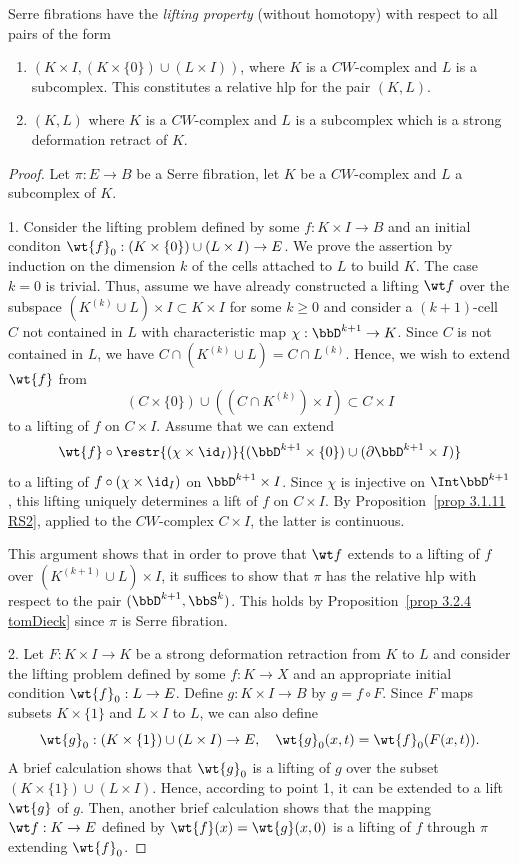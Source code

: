 \begin{prop}[{{\cite[Prop.~3.2.3]{RS2}}}]\label{prop 3.2.3 RS2}
    Serre fibrations have the \textit{lifting property} (without homotopy) with respect to all pairs of the form
    \begin{enumerate}
        \item $(K\times I,(K\times \{0\})\cup(L\times I))$, where $K$ is a $CW$-complex and $L$ is a subcomplex. This constitutes a relative \gls{hlp} for the pair $(K,L)$.
        \item $(K,L)$ where $K$ is a $CW$-complex and $L$ is a subcomplex which is a strong deformation retract of $K$.
    \end{enumerate}
\end{prop}
\begin{proof}
    Let $\pi:E\to B$ be a Serre fibration, let $K$ be a $CW$-complex and $L$ a subcomplex of $K$.

    1. Consider the lifting problem defined by some $f:K\times I\to B$ and an initial conditon $\wt{f}_0:(K\times\{0\})\cup(L\times I)\to E$. We prove the assertion by induction on the dimension $k$ of the cells attached to $L$ to build $K$. The case $k=0$ is trivial. Thus, assume we have already constructed a lifting $\wt f$ over the subspace $(K^{(k)}\cup L)\times I\subset K\times I$ for some $k\geq 0$ and consider a $(k+1)$-cell $C$ not contained in $L$ with characteristic map $\chi:\bbD^{k+1}\to K$. Since $C$ is not contained in $L$, we have $C\cap (K^{(k)}\cup L)=C\cap L^{(k)}$. Hence, we wish to extend $\wt{f}$ from 
    \[(C\times\{0\}) \cup((C\cap K^{(k)})\times I)\subset C\times I\]
    to a lifting of $f$ on $C\times I$. Assume that we can extend
    \[\wt{f}\circ \restr{(\chi\times\id_I)}{(\bbD^{k+1}\times\{0\})\cup (\partial \bbD^{k+1}\times I)}\]
    to a lifting of $f\circ (\chi\times\id_I)$ on $\bbD^{k+1}\times I$. Since $\chi $ is injective on $\Int \bbD^{k+1}$, this lifting uniquely determines a lift of $f$ on $C\times I$. By Proposition~\ref{prop 3.1.11 RS2}, applied to the $CW$-complex $C\times I$, the latter is continuous.

    This argument shows that in order to prove that $\wt f$ extends to a lifting of $f$ over $(K^{(k+1)}\cup L)\times I$, it suffices to show that $\pi$ has the relative \gls{hlp} with respect to the pair $(\bbD^{k+1},\bbS^k)$. This holds by Proposition~\ref{prop 3.2.4 tomDieck} since $\pi$ is Serre fibration.

    2. Let $F:K\times I\to K$ be a strong deformation retraction from $K$ to $L$ and consider the lifting problem defined by some $f:K\to X$ and an appropriate initial condition $\wt{f}_0:L\to E$. Define $g:K\times I\to B$ by $g=f\circ F$. Since $F$ maps subsets $K\times\{1\}$ and $L\times I$ to $L$, we can also define
    \[\wt{g}_0:(K\times\{1\})\cup(L\times I)\to E,\quad \wt{g}_0(x,t)=\wt{f}_0(F(x,t)).\]
    A brief calculation shows that $\wt{g}_0$ is a lifting of $g$ over the subset $(K\times\{1\})\cup(L\times I)$. Hence, according to point 1, it can be extended to a lift $\wt{g}$ of $g$. Then, another brief calculation shows that the mapping $\wt f:K\to E$ defined by $\wt{f}(x)=\wt{g}(x,0)$ is a lifting of $f$ through $\pi$ extending $\wt{f}_0$.
\end{proof}

